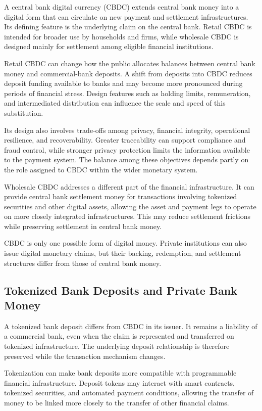 A central bank digital currency (CBDC) extends central bank money into a digital form that can circulate on new payment and settlement infrastructures. Its defining feature is the underlying claim on the central bank. Retail CBDC is intended for broader use by households and firms, while wholesale CBDC is designed mainly for settlement among eligible financial institutions.

Retail CBDC can change how the public allocates balances between central bank money and commercial-bank deposits. A shift from deposits into CBDC reduces deposit funding available to banks and may become more pronounced during periods of financial stress. Design features such as holding limits, remuneration, and intermediated distribution can influence the scale and speed of this substitution.

Its design also involves trade-offs among privacy, financial integrity, operational resilience, and recoverability. Greater traceability can support compliance and fraud control, while stronger privacy protection limits the information available to the payment system. The balance among these objectives depends partly on the role assigned to CBDC within the wider monetary system.

Wholesale CBDC addresses a different part of the financial infrastructure. It can provide central bank settlement money for transactions involving tokenized securities and other digital assets, allowing the asset and payment legs to operate on more closely integrated infrastructures. This may reduce settlement frictions while preserving settlement in central bank money.

CBDC is only one possible form of digital money. 
Private institutions can also issue digital monetary claims, but their backing, redemption, and settlement structures differ from those of central bank money.



\subsection{Tokenized Bank Deposits and Private Bank Money}

A tokenized bank deposit differs from CBDC in its issuer. It remains a liability of a commercial bank, even when the claim is represented and transferred on tokenized infrastructure. The underlying deposit relationship is therefore preserved while the transaction mechanism changes.

Tokenization can make bank deposits more compatible with programmable financial infrastructure. Deposit tokens may interact with smart contracts, tokenized securities, and automated payment conditions, allowing the transfer of money to be linked more closely to the transfer of other financial claims.

